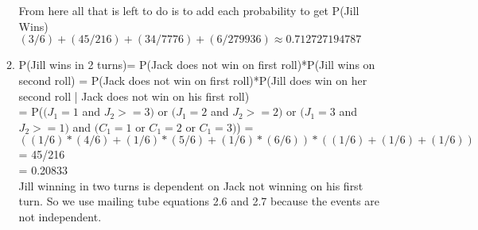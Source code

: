 \documentclass{article}
\begin{document}
\begin{enumerate}
\begin{enumerate}
            \\ 
            \\From here all that is left to do is to add each probability to get P(Jill Wins)
            \\$(3/6)+(45/216)+(34/7776)+(6/279936) \approx 0.712727194787$
            \\
            \item P(Jill wins in 2 turns)= P(Jack does not win on first roll)*P(Jill wins on second roll) = P(Jack does not win on first roll)*P(Jill does win on her second roll | Jack does not win on his first roll)
            \\= P($(J_1 = 1$ and $J_2 >= 3)$ or $(J_1 = 2$ and $J_2 >= 2)$ or $(J_1 = 3$ and $J_2 >= 1) $ and $(C_1 = 1$ or $C_1 = 2$ or $C_1 = 3)$) = $((1/6)*(4/6)+(1/6)*(5/6)+(1/6)*(6/6))*((1/6)+(1/6)+(1/6))$
            \\= 45/216
            \\= 0.20833
            \\Jill winning in two turns is dependent on Jack not winning on his first turn. So we use mailing tube equations 2.6 and 2.7 because the events are not independent.
            \\
            

\end{enumerate}
\end{enumerate}
\end{document}
